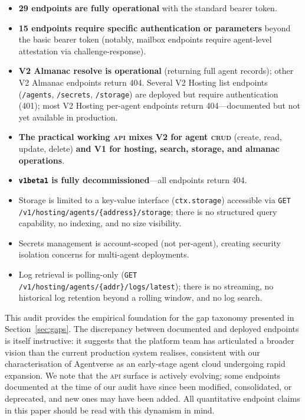 \documentclass[twoside,11pt]{article}
\begin{document}
\begin{itemize}[leftmargin=*]

\item \textbf{29 endpoints are fully operational} with the standard bearer
token.

\item \textbf{15 endpoints require specific authentication or parameters}
beyond the basic bearer token (notably, mailbox endpoints require agent-level
attestation via challenge-response).

\item \textbf{V2 Almanac resolve is operational} (returning full agent records);
other V2 Almanac endpoints return 404.  Several V2 Hosting list endpoints
(\texttt{/agents}, \texttt{/secrets}, \texttt{/storage}) are deployed but
require authentication (401); most V2 Hosting per-agent endpoints return
404---documented but not yet available in production.

\item \textbf{The practical working \textsc{api} mixes V2 for agent
\textsc{crud}} (create, read, update, delete) \textbf{and V1 for hosting,
search, storage, and almanac operations}.

\item \textbf{\texttt{v1beta1} is fully decommissioned}---all endpoints return
404.

\item Storage is limited to a key-value interface (\texttt{ctx.storage})
accessible via \texttt{GET /v1/hosting/\allowbreak{}agents/\allowbreak{}\{address\}/\allowbreak{}storage}; there is
no structured query capability, no indexing, and no size visibility.

\item Secrets management is account-scoped (not per-agent), creating security
isolation concerns for multi-agent deployments.

\item Log retrieval is polling-only (\texttt{GET /v1/hosting/agents/\{addr\}/}\allowbreak\texttt{logs/latest}); there is no streaming, no historical log retention beyond a rolling window, and no log search.

\end{itemize}

This audit provides the empirical foundation for the gap taxonomy presented in
Section~\ref{sec:gaps}.  The discrepancy between documented and deployed
endpoints is itself instructive: it suggests that the platform team has
articulated a broader vision than the current production system realises,
consistent with our characterisation of Agentverse as an early-stage agent
cloud undergoing rapid expansion.  We note that the \textsc{api} surface is
actively evolving; some endpoints documented at the time of our audit have
since been modified, consolidated, or deprecated, and new ones may have
been added.  All quantitative endpoint claims in this paper should be read
with this dynamism in mind.
\end{document}
